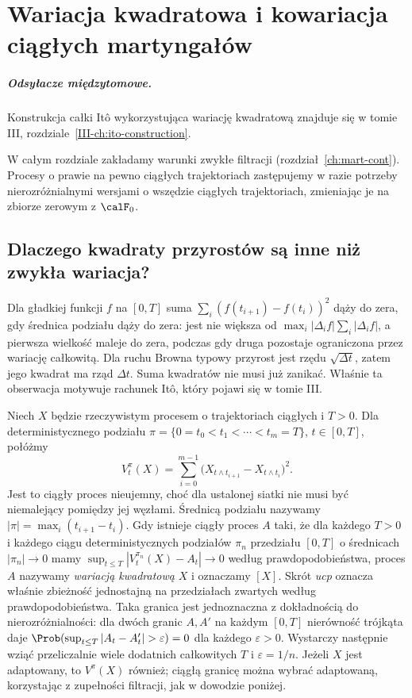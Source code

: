 \chapter{Wariacja kwadratowa i kowariacja ciągłych martyngałów}
\label{ch:quadratic-cont}
\paragraph{Odsyłacze międzytomowe.} Konstrukcja całki Itô wykorzystująca wariację kwadratową znajduje się w tomie III, rozdziale~\ref{III-ch:ito-construction}.


W całym rozdziale zakładamy warunki zwykłe filtracji
(rozdział~\ref{ch:mart-cont}). Procesy o prawie na pewno
ciągłych trajektoriach zastępujemy w razie potrzeby
nierozróżnialnymi wersjami o wszędzie ciągłych
trajektoriach, zmieniając je na zbiorze zerowym z $\calF_0$.

\section{Dlaczego kwadraty przyrostów są inne niż zwykła wariacja?}
Dla gładkiej funkcji $f$ na $[0,T]$ suma
$\sum_i(f(t_{i+1})-f(t_i))^2$ dąży do zera, gdy
średnica podziału dąży do zera: jest nie większa od
$\max_i|\Delta_i f|\sum_i|\Delta_i f|$, a pierwsza
wielkość maleje do zera, podczas gdy druga pozostaje
ograniczona przez wariację całkowitą. Dla ruchu Browna
typowy przyrost jest rzędu $\sqrt{\Delta t}$, zatem
jego kwadrat ma rząd $\Delta t$. Suma kwadratów
nie musi już zanikać. Właśnie ta obserwacja motywuje
rachunek Itô, który pojawi się w tomie III.

\begin{definicja}
Niech $X$ będzie rzeczywistym procesem o trajektoriach
ciągłych i $T>0$. Dla deterministycznego podziału
$\pi=\{0=t_0<t_1<\cdots<t_m=T\}$, $t\in[0,T]$,
połóżmy
\[
V_t^\pi(X)=\sum_{i=0}^{m-1}
\bigl(X_{t\wedge t_{i+1}}-X_{t\wedge t_i}\bigr)^2.
\]
Jest to ciągły proces nieujemny, choć dla ustalonej
siatki nie musi być niemalejący pomiędzy jej węzłami.
Średnicą podziału nazywamy $|\pi|=\max_i(t_{i+1}-t_i)$.
Gdy istnieje ciągły proces $A$ taki, że dla każdego
$T>0$ i każdego ciągu deterministycznych podziałów
$\pi_n$ przedziału $[0,T]$ o średnicach $|\pi_n|\to0$
mamy
$\sup_{t\le T}|V_t^{\pi_n}(X)-A_t|\to0$
według prawdopodobieństwa, proces $A$ nazywamy
\emph{wariacją kwadratową} $X$ i oznaczamy $[X]$.
Skrót \emph{ucp} oznacza właśnie zbieżność jednostajną
na przedziałach zwartych według prawdopodobieństwa.
Taka granica jest jednoznaczna z dokładnością do
nierozróżnialności: dla dwóch granic $A,A'$ na każdym
$[0,T]$ nierówność trójkąta daje
$\Prob(\sup_{t\le T}|A_t-A'_t|>\varepsilon)=0$
dla każdego $\varepsilon>0$. Wystarczy następnie
wziąć przeliczalnie wiele dodatnich całkowitych $T$
i $\varepsilon=1/n$.
Jeżeli $X$ jest adaptowany, to $V^\pi(X)$ również;
ciągłą granicę można wybrać adaptowaną, korzystając
z zupełności filtracji, jak w dowodzie poniżej.
\end{definicja}

